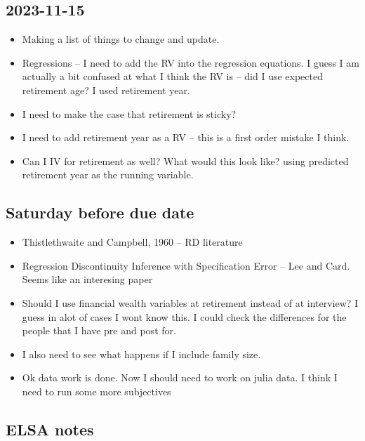 \documentclass[12pt]{article}
\begin{document}
\subsection{2023-11-15}
\begin{itemize}
      \item Making a list of things to change and update.
      \item Regressions -- I need to add the RV into the regression equations. I
            guess I am actually a bit confused at what I think the RV is -- did
            I use expected retirement age? I used retirement year.

      \item I need to make the case that retirement is sticky?
      \item I need to add retirement year as a RV -- this is a first order
            mistake I think.

      \item Can I IV for retirement as well? What would this look like? using
            predicted retirement year as the running variable.

\end{itemize}

\subsection{Saturday before due date}
\begin{itemize}
      \item Thistlethwaite and Campbell, 1960 -- RD literature
      \item Regression Discontinuity Inference with Specification Error -- Lee
            and Card. Seems like an interesing paper
      \item Should I use financial wealth variables at retirement instead of at
            interview? I guess in alot of cases I wont know this. I could check
            the differences for the people that I have pre and post for.
      \item I also need to see what happens if I include family size.
      \item Ok data work is done. Now I should need to work on julia data. I
            think I need to run some more subjectives
\end{itemize}

\subsection{ELSA notes}
\end{document}
